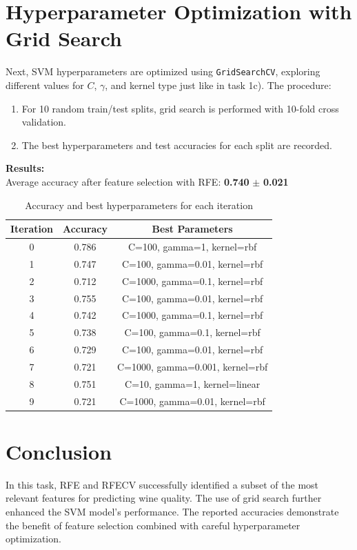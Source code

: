 \documentclass[12pt]{article}
\begin{document}
\section{Hyperparameter Optimization with Grid Search}

Next, SVM hyperparameters are optimized using \texttt{GridSearchCV}, exploring different values for $C$, $\gamma$, and kernel type just like in task 1c). The procedure:
\begin{enumerate}
    \item For 10 random train/test splits, grid search is performed with 10-fold cross validation.
    \item The best hyperparameters and test accuracies for each split are recorded.
\end{enumerate}
\newpage
\textbf{Results:}\\
Average accuracy after feature selection with RFE: \textbf{0.740} $\pm$ \textbf{0.021}\\
\begin{table}[h]
\centering
\begin{tabular}{|c|c|c|}
\hline
\textbf{Iteration} & \textbf{Accuracy} & \textbf{Best Parameters} \\
\hline
0 & 0.786 & C=100, gamma=1, kernel=rbf \\
\hline
1 & 0.747 & C=100, gamma=0.01, kernel=rbf \\
\hline
2 & 0.712 & C=1000, gamma=0.1, kernel=rbf \\
\hline
3 & 0.755 & C=100, gamma=0.01, kernel=rbf \\
\hline
4 & 0.742 & C=1000, gamma=0.1, kernel=rbf \\
\hline
5 & 0.738 & C=100, gamma=0.1, kernel=rbf \\
\hline
6 & 0.729 & C=100, gamma=0.01, kernel=rbf \\
\hline
7 & 0.721 & C=1000, gamma=0.001, kernel=rbf \\
\hline
8 & 0.751 & C=10, gamma=1, kernel=linear \\
\hline
9 & 0.721 & C=1000, gamma=0.01, kernel=rbf \\
\hline
\end{tabular}
\caption{Accuracy and best hyperparameters for each iteration}
\label{tab:results}
\end{table}

\section{Conclusion}

In this task, RFE and RFECV successfully identified a subset of the most relevant features for predicting wine quality. The use of grid search further enhanced the SVM model's performance. The reported accuracies demonstrate the benefit of feature selection combined with careful hyperparameter optimization.
\end{document}
